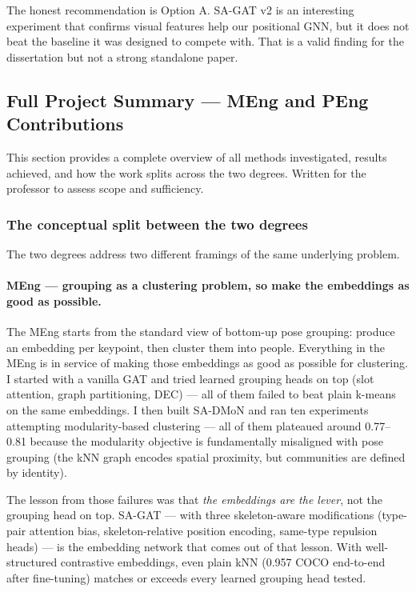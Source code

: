 The honest recommendation is Option A. SA-GAT v2 is an interesting experiment that confirms visual features help our positional GNN, but it does not beat the baseline it was designed to compete with. That is a valid finding for the dissertation but not a strong standalone paper.


\subsection{Full Project Summary --- MEng and PEng Contributions}

This section provides a complete overview of all methods investigated, results achieved, and how the work splits across the two degrees. Written for the professor to assess scope and sufficiency.

\subsubsection{The conceptual split between the two degrees}

The two degrees address two different framings of the same underlying problem.

\paragraph{MEng --- grouping as a clustering problem, so make the embeddings as good as possible.}

The MEng starts from the standard view of bottom-up pose grouping: produce an embedding per keypoint, then cluster them into people. Everything in the MEng is in service of making those embeddings as good as possible for clustering. I started with a vanilla GAT and tried learned grouping heads on top (slot attention, graph partitioning, DEC) --- all of them failed to beat plain k-means on the same embeddings. I then built SA-DMoN and ran ten experiments attempting modularity-based clustering --- all of them plateaued around 0.77--0.81 because the modularity objective is fundamentally misaligned with pose grouping (the kNN graph encodes spatial proximity, but communities are defined by identity).

The lesson from those failures was that \emph{the embeddings are the lever}, not the grouping head on top. SA-GAT --- with three skeleton-aware modifications (type-pair attention bias, skeleton-relative position encoding, same-type repulsion heads) --- is the embedding network that comes out of that lesson. With well-structured contrastive embeddings, even plain kNN (0.957 COCO end-to-end after fine-tuning) matches or exceeds every learned grouping head tested.

